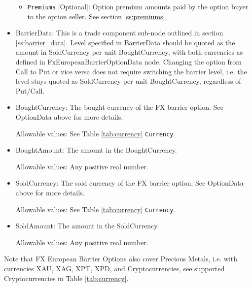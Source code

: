 \begin{itemize}
\begin{itemize}
\item \lstinline!Premiums! [Optional]: Option premium amounts paid by the option buyer to the option seller. See section \ref{ss:premiums}

\end{itemize}





\item BarrierData: This is a trade component sub-node outlined in section \ref{ss:barrier_data}.
Level specified in BarrierData should be quoted as the amount in SoldCurrency per unit BoughtCurrency, with both currencies as defined in FxEuropeanBarrierOptionData node.
Changing the option from Call to Put or vice versa does not require switching the barrier level, i.e. the level stays quoted as SoldCurrency per unit BoughtCurrency, regardless of Put/Call.

\item BoughtCurrency: The bought currency of the FX barrier option. See OptionData above for more details.

Allowable values:  See Table \ref{tab:currency} \lstinline!Currency!.

\item BoughtAmount: The amount in the BoughtCurrency.  

Allowable values:  Any positive real number.

\item SoldCurrency: The sold currency of the FX barrier option. See OptionData above for more details.

Allowable values:  See Table \ref{tab:currency} \lstinline!Currency!.

\item SoldAmount: The amount in the SoldCurrency.  

Allowable values:  Any positive real number.

\end{itemize}

Note that FX European Barrier Options also cover Precious Metals, i.e. with
currencies XAU, XAG, XPT, XPD, and Cryptocurrencies,  see supported Cryptocurrencies in Table \ref{tab:currency}.